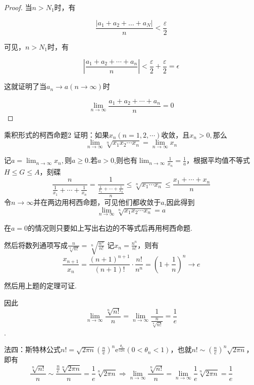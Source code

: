 \begin{xiti}
\begin{solution}
\begin{enumerate}
\begin{proof}
			当$n>N_1$时，有
			
			$$\frac{\left|a_{1}+a_{2}+\dots+a_{N}\right|}{n}<\frac{\varepsilon}{2}$$
			
			可见，$n>N_1$时，有
			
			$$\left|\frac{a_{1}+a_{2}+\cdots+a_{n}}{n}\right|<\frac{\varepsilon}{2}+\frac{\varepsilon}{2}=\epsilon$$
			
			这就证明了当$a_{n}\rightarrow a (n\rightarrow\infty)$时
			
			$$ 
			\lim _{n \rightarrow \infty} \frac{a_{1}+a_{2}+\cdots+a_{n}}{n}=0
			$$
			
				\end{proof}
		\begin{theorem}{乘积形式的柯西命题}{2}
			证明：如果$x_n(n=1,2,\cdots )$收敛，且$x_n>0,$那么
			$$ 
			\lim _{n \rightarrow \infty} \sqrt[n]{x_{1} x_{2} \cdots x_{n}}=\lim _{n \rightarrow \infty} x_{n}
			$$
		\end{theorem}
			\begin{solution}
			记$a=\lim_{n \rightarrow \infty}x_n,$则$a\geq 0$.若$a> 0$,则也有$\lim_{n \rightarrow \infty}\frac{1}{x_n}
			=\frac{1}{a}$，根据平均值不等式$H\leq G\leq A$，刻碟
			\[\frac{n}{\frac{1}{x_{1}}+\cdots+\frac{1}{x_{n}}}=\frac{1}{\frac{\frac{1}{x_{1}}+\cdots+\frac{1}{x_{n}}}{n}} \leqslant \sqrt[n]{x_{1} \cdots x_{n}} \leqslant \frac{x_{1}+\cdots+x_{n}}{n}\]
			令$n\rightarrow \infty$并在两边用柯西命题，可见他们都收敛于$a$,因此得到
			$$ 
			\lim _{n \rightarrow \infty} \sqrt[n]{x_{1} x_{2} \cdots x_{n}}=a
			$$
			
			在$a=0$的情况则只要如上写出右边的不等式后再用柯西命题.
		\end{solution}
	然后将数列通项写成$\frac{n}{\sqrt[n]{n !}}=\sqrt[n]{\frac{n^{n}}{n !}}$
	记$x_n=\frac{n^n}{n!}$，则有
	\[\frac{x_{n+1}}{x_{n}}=\frac{(n+1)^{n+1}}{(n+1) !} \cdot \frac{n !}{n^{n}}=\left(1+\frac{1}{n}\right)^{n} \rightarrow e\]
	
	然后用上题的定理可证.
	
	因此
		$$\lim_{n \rightarrow \infty}\frac{\sqrt[n]{n!}}{n}=
		\lim_{n \rightarrow \infty}\frac{1}{\frac{n}{\sqrt[n]{n!}}}=\frac{1}{e}$$.
	
	法四：斯特林公式$n !=\sqrt{2 \pi n}\left(\frac{n}{\mathrm{e}}\right)^{n} \mathrm{e}^{\frac{\theta_{\mathrm{n}}}{12 n}}\left(0<\theta_{n}<1\right)$，也就$n!\sim\left(\frac{n}{e}\right)^n\sqrt{2\pi n}$，即有
	\[\frac{\sqrt[n]{n!}}{n}\sim\frac{\frac{n}{e}\sqrt[n]{2\pi n}}{n}=\frac{1}{e}\sqrt[n]{2\pi n}\Rightarrow\lim_{n\rightarrow\infty}\frac{\sqrt[n]{n!}}{n}=\lim_{n\rightarrow\infty}\frac{1}{e}\sqrt[n]{2\pi n}=\frac{1}{e}\]	
	

\end{enumerate}
\end{solution}
\end{xiti}
